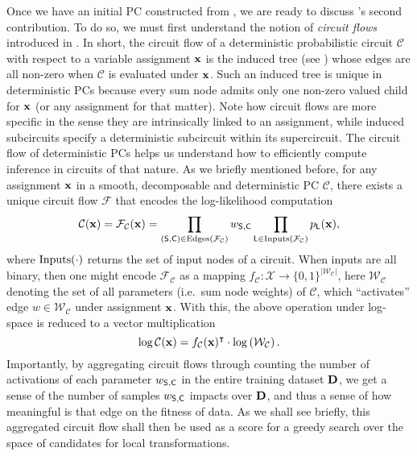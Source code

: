 Once we have an initial PC constructed from , we are ready to discuss
's second contribution. To do so, we must first understand the notion of
\emph{circuit flows} introduced in \citet{dang20}. In short, the circuit flow of a deterministic
probabilistic circuit $\mathcal{C}$ with respect to a variable assignment $\mathbf{x}$ is the induced
tree (see ) whose edges are all non-zero when $\mathcal{C}$ is evaluated under
$\mathbf{x}$. Such an induced tree is unique in deterministic PCs because every sum node admits only
one non-zero valued child for $\mathbf{x}$ (or any assignment for that matter). Note how circuit flows
are more specific in the sense they are intrinsically linked to an assignment, while induced
subcircuits specify a deterministic subcircuit within its supercircuit. The circuit flow of
deterministic PCs helps us understand how to efficiently compute inference in circuits of that
nature. As we briefly mentioned before, for any assignment $\mathbf{x}$ in a smooth, decomposable and
deterministic PC $\mathcal{C}$, there exists a unique circuit flow $\mathcal{F}$ that encodes the
log-likelihood computation
\begin{equation*}
  \mathcal{C}(\mathbf{x})=\mathcal{F}_\mathcal{C}(\mathbf{x})=\prod_{(\operatorname{\textsf{S}},\operatorname{\textsf{C}})\in
  \operatorname{\normalfont{Edges}}(\mathcal{F}_\mathcal{C})}w_{\operatorname{\textsf{S}},\operatorname{\textsf{C}}}\prod_{\operatorname{\textsf{L}}\in\operatorname{\normalfont{Inputs}}(\mathcal{F}_\mathcal{C})}
  p_{\operatorname{\textsf{L}}}(\mathbf{x}),
\end{equation*}
where $\operatorname{\normalfont{Inputs}}(\cdot)$ returns the set of input nodes of a circuit. When inputs are all binary,
then one might encode $\mathcal{F}_\mathcal{C}$ as a mapping $f_\mathcal{C}:\mathcal{X}\to
\{0,1\}^{|\mathcal{W}_\mathcal{C}|}$, here $\mathcal{W}_\mathcal{C}$ denoting the set of all
parameters (i.e.\ sum node weights) of $\mathcal{C}$, which ``activates'' edge
$w\in\mathcal{W}_\mathcal{C}$ under assignment $\mathbf{x}$. With this, the above operation under
log-space is reduced to a vector multiplication
\begin{equation*}
  \log\mathcal{C}(\mathbf{x})=f_\mathcal{C}(\mathbf{x})^\intercal\cdot\log\left(\mathcal{W}_\mathcal{C}\right).
\end{equation*}
Importantly, by aggregating circuit flows through counting the number of activations of each
parameter $w_{\operatorname{\textsf{S}},\operatorname{\textsf{C}}}$ in the entire training dataset $\mathbf{D}$, we get a sense of the number
of samples $w_{\operatorname{\textsf{S}},\operatorname{\textsf{C}}}$ impacts over $\mathbf{D}$, and thus a sense of how meaningful is that
edge on the fitness of data. As we shall see briefly, this aggregated circuit flow shall then be
used as a score for a greedy search over the space of candidates for local transformations.


